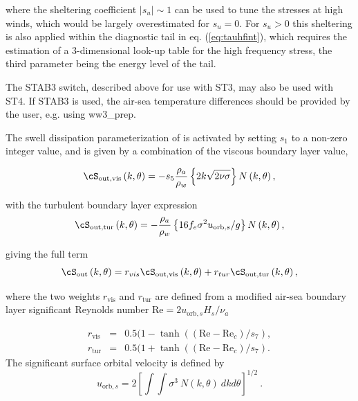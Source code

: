 \noindent 
where the sheltering coefficient $\left|s_u\right|\sim 1$ can be used to tune
the stresses at high winds, which would be largely overestimated for
$s_u=0$. For $s_u > 0$ this sheltering is also applied within the diagnostic
tail in eq. (\ref{eq:tauhfint}), which requires the estimation of a
3-dimensional look-up table for the high frequency stress, the third parameter
being the energy level of the tail.

The {\code STAB3} switch, described above for use with {\code ST3}, may also be used with {\code ST4}. If {\code STAB3} is used, the air-sea  temperature differences should be provided by the user, e.g. using {\file ww3\_prep}.

The swell dissipation parameterization of \cite{art:ACC09} is activated by
setting $s_1$ to a non-zero integer value, and is given by a combination of
the viscous boundary layer value,

\begin{equation}
\cS_{\mathrm{out,vis}}\left(k,\theta\right) = - s_5 \frac{\rho_a}{\rho_w}\left\{ 2 k \sqrt{2
\nu \sigma}\right\}  N \left(k,\theta\right) , \label{eq:Dore}
\end{equation}

\noindent
with the turbulent boundary layer expression 
\begin{equation}
\cS_{\mathrm{out,tur}} \left(k,\theta\right) = - \frac{\rho_a}{\rho_w}\left\{  16 f_e
\sigma^2 u_{\mathrm{orb},s} / g \right\}
 N\left(k,\theta\right),  \label{eq:swell_turb}
\end{equation}

\noindent
giving the full term 
\begin{equation}
\cS_{\mathrm{out}} \left(k,\theta\right) = r_{vis} \cS_{\mathrm{out,vis}}\left(k,\theta\right)  + 
 r_{tur} \cS_{\mathrm{out,tur}}\left(k,\theta\right),  
 \label{eq:swell_comb}
\end{equation}

\noindent
where the two weights $ r_{\mathrm{vis}} $ and $r_{\mathrm{tur}}$ are defined from 
a modified  air-sea boundary layer significant Reynolds number $\mathrm{Re} = 2
u_{\mathrm{orb},s} H_s / \nu_{a}$ 

\begin{eqnarray}
 r_{\mathrm{vis}} &=& 0.5 (1- \tanh((\mathrm{Re}-\mathrm{Re}_{c})/s_7), \\
 r_{\mathrm{tur}}&=& 0.5 (1+ \tanh((\mathrm{Re}-\mathrm{Re}_{c})/s_7) .
\end{eqnarray}
The significant surface orbital velocity is defined by
\begin{equation} u_{\mathrm{orb},s} = 2 \left [  \int \!\!\!\! \int
      \sigma^3 \: N(k,\theta) \: dk d\theta \right ] ^{1/2}
      \: . \label{eq:ub_orbs} \end{equation}

